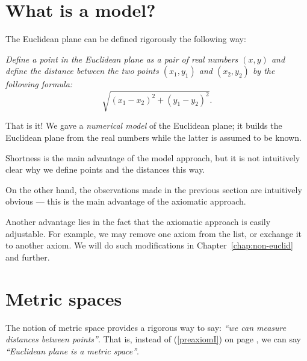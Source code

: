 \section*{What is a model?}
\label{page:model}

The Euclidean plane can be defined rigorously the following way:

{}\emph{Define a {}\emph{point} in the Euclidean plane as a pair of real numbers $(x,y)$ and define the {}\emph{distance} between the two points $(x_1,y_1)$ and $(x_2,y_2)$ by the following formula:}
\[\sqrt{(x_1-x_2)^2+(y_1-y_2)^2}.\]

That is it!
We gave a {}\emph{numerical model} of the Euclidean plane;
it builds the Euclidean plane from the real numbers
while the latter is assumed to be known.

Shortness is the main advantage of the model approach,
but it is not intuitively clear why we define points and the distances this way.

On the other hand, the observations made in the previous section are intuitively obvious ---
this is the main advantage of the axiomatic approach.

Another advantage lies in the fact that the axiomatic approach is easily adjustable. 
For example, we may remove one axiom from the list,
or exchange it to another axiom. 
We will do such modifications in Chapter~\ref{chap:non-euclid} and further.

\section*{Metric spaces}

The notion of metric space provides 
a rigorous way to say: {}\emph{``we can measure distances between points''}.
That is, instead of (\ref{preaxiomI}) on page \pageref{preaxiomI},
we can say {}\emph{``Euclidean plane is a metric space''}.

